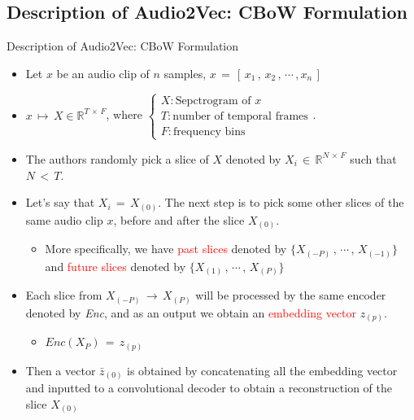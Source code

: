 \documentclass{Beamer}
\begin{document}
\subsection{Description of Audio2Vec: CBoW Formulation}
\begin{frame}[t,allowframebreaks]{Description of Audio2Vec: CBoW Formulation} 

\begin{itemize}

\item Let $x$ be an audio clip of $n$ samples, $x \, = \, [\, x_1 \, , \, x_2 \, , \,  \cdots \, , x_n \,]$

\item $x \, \mapsto \, X \in \mathbb{R}^{T \, \times \, F}$, where $\begin{cases}

X: \text{Sepctrogram of } x \\
T: \text{number of temporal frames} \\
F: \text{frequency bins}
\end{cases}$.

\item The authors randomly pick a slice of $X$ denoted by $X_i \, \in \,\mathbb{R}^{N \, \times \, F}$ such that $N \, < \, T$.

\item  Let's say that $X_i \, = \, X_{(0)}$. The next step is to pick some other slices of the same audio clip $x$, before and after the slice $X_{(0)}$.

	\begin{itemize}
	\item More specifically, we have \textcolor{red}{past slices} denoted by $\{ X_{(-P)} \, , \, \cdots \, , \, X_{(-1)} \}$ and \textcolor{red}{future slices} denoted by $\{ X_{(1)} \, , \, \cdots \, ,\, X_{(P)} \}$
	\end{itemize}

\item Each slice from $ X_{(-P)} \, \rightarrow \, X_{(P)}$ will be processed by the same encoder denoted by \textit{Enc}, and as an output we obtain an \textcolor{red}{embedding vector} $z_{(p)}$.

	\begin{itemize}
	\item $Enc(X_{P}) \, = \, z_{(p)}$
	\end{itemize}

\item Then a vector $\bar{z}_{(0)}$ is obtained by concatenating all the embedding vector and inputted to a convolutional decoder to obtain a reconstruction of the slice $X_{(0)}$


\end{itemize}
\end{frame}
\end{document}
